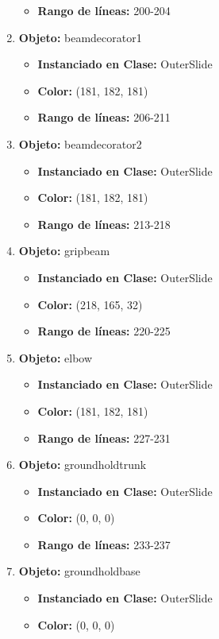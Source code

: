 \documentclass[10pt, a4paper]{article}
\begin{document}
\begin{enumerate}
\begin{itemize}
		\item \textbf{Rango de líneas:} 200-204
	\end{itemize}
	\item \textbf{Objeto:} beamdecorator1
	\begin{itemize}
		\item \textbf{Instanciado en Clase:} OuterSlide
		\item \textbf{Color:} (181, 182, 181)
		\item \textbf{Rango de líneas:} 206-211
	\end{itemize}
	\item \textbf{Objeto:} beamdecorator2
	\begin{itemize}
		\item \textbf{Instanciado en Clase:} OuterSlide
		\item \textbf{Color:} (181, 182, 181)
		\item \textbf{Rango de líneas:} 213-218
	\end{itemize}
	\item \textbf{Objeto:} gripbeam 
	\begin{itemize}
		\item \textbf{Instanciado en Clase:} OuterSlide
		\item \textbf{Color:} (218, 165, 32)
		\item \textbf{Rango de líneas:} 220-225
	\end{itemize}
	\item \textbf{Objeto:} elbow
	\begin{itemize}
		\item \textbf{Instanciado en Clase:} OuterSlide
		\item \textbf{Color:} (181, 182, 181)
		\item \textbf{Rango de líneas:} 227-231
	\end{itemize}
	\item \textbf{Objeto:} groundholdtrunk
	\begin{itemize}
		\item \textbf{Instanciado en Clase:} OuterSlide
		\item \textbf{Color:} (0, 0, 0)
		\item \textbf{Rango de líneas:} 233-237
	\end{itemize}
	\item \textbf{Objeto:} groundholdbase 
	\begin{itemize}
		\item \textbf{Instanciado en Clase:} OuterSlide
		\item \textbf{Color:} (0, 0, 0)

\end{itemize}
\end{enumerate}
\end{document}
